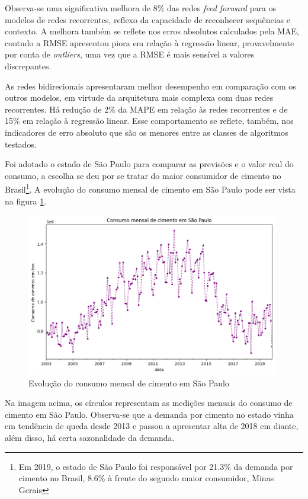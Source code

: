 Observa-se uma significativa melhora de 8\% das redes \textit{feed forward} para os modelos
de redes recorrentes, reflexo da capacidade de reconhecer sequências e contexto.
A melhora também se reflete nos erros absolutos calculados pela MAE, contudo a 
RMSE apresentou piora em relação à regressão linear, provavelmente por conta 
de \textit{outliers}, uma vez que a RMSE é mais sensível a valores discrepantes.

As redes bidirecionais apresentaram melhor desempenho em comparação com os outros 
modelos, em virtude da arquitetura mais complexa com duas redes recorrentes. Há 
redução de 2\% da MAPE em relação às redes recorrentes e de 15\% em relação à 
regressão linear. Esse comportamento se reflete, também, nos indicadores de 
erro absoluto que são os menores entre as classes de algoritmos testados.

Foi adotado o estado de São Paulo para comparar as previsões  e o valor real 
do consumo, a escolha se deu por 
se tratar do maior consumidor de cimento no Brasil\footnote{Em 2019, o estado 
de São Paulo foi 
responsável por 21.3\% da demanda por cimento no Brasil, 8.6\% à frente do 
segundo maior consumidor, Minas Gerais}. A evolução do consumo 
mensal de cimento em São Paulo pode ser vista na figura \ref{consumo-sp}.

\begin{figure}[H]
    \centering
    \includegraphics[width=11cm]{../figuras/graficos/evolucao-consumo-sp.png}
    \caption{Evolução do consumo mensal de cimento em São Paulo}
    \label{consumo-sp}
\end{figure}

Na imagem acima, os círculos representam as medições mensais do consumo de 
cimento em São Paulo. Observa-se que a demanda por cimento no estado vinha em tendência
de queda desde 2013 e passou a apresentar alta de 2018 em diante, além disso, há certa
sazonalidade da demanda.

